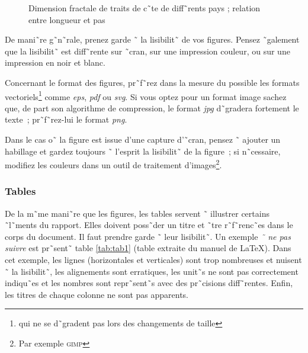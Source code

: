 \begin{figure}[htbp]
  \centering
{}
  \caption{Dimension fractale de traits de c˜te de diff˜rents pays ; relation entre longueur et pas}
  \label{fig:fract}
\end{figure}

De mani˜re g˜n˜rale, prenez garde ˜ la lisibilit˜ de vos figures. Pensez
˜galement que la lisibilit˜ est diff˜rente sur ˜cran, sur une impression
couleur, ou sur une impression en noir et blanc.

Concernant le format des figures, pr˜f˜rez dans la mesure du possible les
formats vectoriels\footnote{qui ne se d˜gradent pas lors des changements de
  taille} comme \emph{eps}, \emph{pdf} ou \emph{svg}. Si vous optez pour un
format image sachez que, de part son algorithme de compression, le format
\emph{jpg} d˜gradera fortement le texte~; pr˜f˜rez-lui le format \emph{png}.

Dans le cas o˜ la figure est issue d'une capture d'˜cran, pensez ˜ ajouter un
habillage et gardez toujours ˜ l'esprit la lisibilit˜ de la figure~; si
n˜cessaire, modifiez les couleurs dans un outil de traitement
d'images\footnote{Par exemple \textsc{gimp}}. 

\subsubsection{Tables}

De la m˜me mani˜re que les figures, les tables servent ˜ illustrer certains
˜l˜ments du rapport. Elles doivent poss˜der un titre et ˜tre
r˜f˜renc˜es dans le corps du document. Il faut prendre garde ˜ leur
lisibilit˜. Un exemple \emph{˜ ne pas suivre} est pr˜sent˜ table
\ref{tab:tab1} (table extraite du manuel de \LaTeX). Dans cet exemple, les
lignes (horizontales et verticales) sont 
trop nombreuses et nuisent ˜ la lisibilit˜, les alignements sont erratiques,
les unit˜s ne sont pas correctement indiqu˜es et les nombres sont repr˜sent˜s
avec des pr˜cisions diff˜rentes. Enfin, les titres de chaque colonne ne sont
pas apparents.

